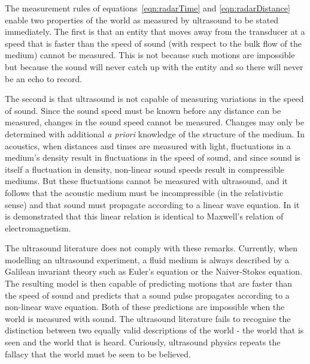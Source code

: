 The measurement rules of equations~\ref{eqn:radarTime} and \ref{eqn:radarDistance} enable two properties of the world as measured by ultrasound to be stated immediately.
The first is that an entity that moves away from the transducer at a speed that is faster than the speed of sound (with respect to the bulk flow of the medium) 
cannot be measured.  
This is not because such motions are impossible but because the sound will never catch  up with the entity and so there will never be an echo to record.

The second is that ultrasound is not capable of  measuring variations in the speed of sound.
Since the sound speed must be known before any distance can be measured,
changes in the sound speed  cannot be measured. 
Changes may only be determined  with additional {\em a priori} knowledge of the structure of the medium. 
In acoustics, when distances and times are measured with light,
fluctuations in a medium's density result in fluctuations in the speed of sound,
and since sound is itself a fluctuation in density, 
non-linear sound speeds result in compressible mediums.
But these fluctuations cannot be measured with ultrasound,
and it follows that the acoustic medium must be incompressible (in the relativistic sense\cite{Pekeris1976, Pekeris1977, Taub1978})
and that  sound must propagate according to a linear wave equation. %
In  it is demonstrated that this linear relation is identical to Maxwell's relation of electromagnetism.

The ultrasound literature does not comply with these remarks.
Currently, when modelling an ultrasound experiment, a fluid medium is always described by a Galilean invariant theory such as Euler's equation or the Naiver-Stokes equation.
The resulting model is then capable of predicting motions that are faster than the speed of sound
and predicts that  a sound pulse  propagates according to  a non-linear wave equation.
Both of these predictions are impossible when the world is measured with sound.
%
The ultrasound literature fails to recognise the distinction between  two equally valid descriptions of the world -
the world that is seen
and the world that is heard.
Curiously, ultrasound physics repeats the   fallacy that  the world must be seen to be believed.

